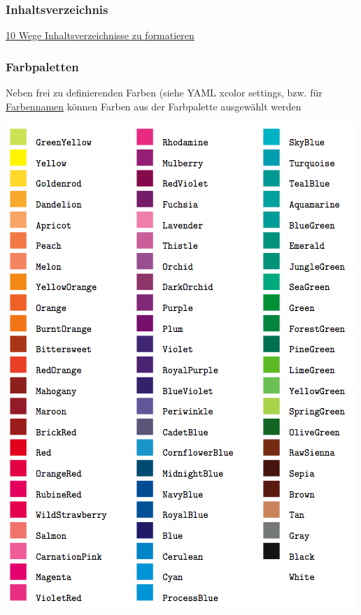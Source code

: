 \documentclass[
  a4paper,
  twoside]{article}
\begin{document}
\hypertarget{inhaltsverzeichnis}{%
\subsubsection{Inhaltsverzeichnis}\label{inhaltsverzeichnis}}

\href{https://texblog.org/2011/09/09/10-ways-to-customize-tocloflot/}{10 Wege Inhaltsverzeichnisse zu formatieren}

\hypertarget{farbpaletten}{%
\subsubsection{Farbpaletten}\label{farbpaletten}}

Neben frei zu definierenden Farben (siehe YAML xcolor settings, bzw. für \href{https://www.latextemplates.com/svgnames-colors}{Farbennamen} können Farben aus der Farbpalette ausgewählt werden

\includegraphics{latexcolor.png}
\end{document}
